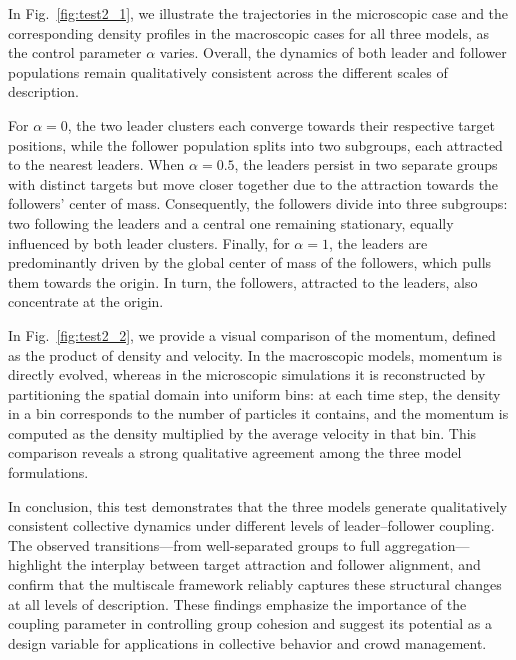 \documentclass[10pt, reqno]{amsart}
\theoremstyle{definition}
\theoremstyle{remark}
\numberwithin{equation}{section}
\begin{document}
In Fig.~\ref{fig:test2_1}, we illustrate the trajectories in the microscopic case and the corresponding density profiles in the macroscopic cases for all three models, as the control parameter $\alpha$ varies. Overall, the dynamics of both leader and follower populations remain qualitatively consistent across the different scales of description.

For $\alpha = 0$, the two leader clusters each converge towards their respective target positions, while the follower population splits into two subgroups, each attracted to the nearest leaders. When $\alpha = 0.5$, the leaders persist in two separate groups with distinct targets but move closer together due to the attraction towards the followers’ center of mass. Consequently, the followers divide into three subgroups: two following the leaders and a central one remaining stationary, equally influenced by both leader clusters. Finally, for $\alpha = 1$, the leaders are predominantly driven by the global center of mass of the followers, which pulls them towards the origin. In turn, the followers, attracted to the leaders, also concentrate at the origin.

In Fig.~\ref{fig:test2_2}, we provide a visual comparison of the momentum, defined as the product of density and velocity. In the macroscopic models, momentum is directly evolved, whereas in the microscopic simulations it is reconstructed by partitioning the spatial domain into uniform bins: at each time step, the density in a bin corresponds to the number of particles it contains, and the momentum is computed as the density multiplied by the average velocity in that bin. This comparison reveals a strong qualitative agreement among the three model formulations.

In conclusion, this test demonstrates that the three models generate qualitatively consistent collective dynamics under different levels of leader–follower coupling.  
The observed transitions—from well-separated groups to full aggregation—highlight the interplay between target attraction and follower alignment, and confirm that the multiscale framework reliably captures these structural changes at all levels of description.  
These findings emphasize the importance of the coupling parameter in controlling group cohesion and suggest its potential as a design variable for applications in collective behavior and crowd management.
\end{document}

